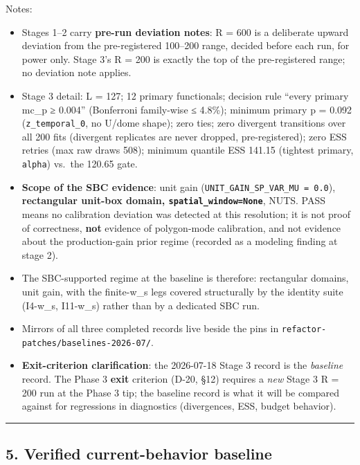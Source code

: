 \documentclass[
  10pt,
]{article}
\providecommand{\tightlist}{%
  \setlength{\itemsep}{0pt}\setlength{\parskip}{0pt}}
\begin{document}
Notes:

\begin{itemize}
\tightlist
\item
  Stages 1--2 carry \textbf{pre-run deviation notes}: R = 600 is a deliberate upward deviation from the pre-registered 100--200 range, decided before each run, for power only. Stage 3's R = 200 is exactly the top of the pre-registered range; no deviation note applies.
\item
  Stage 3 detail: L = 127; 12 primary functionals; decision rule ``every primary mc\_p ≥ 0.004'' (Bonferroni family-wise ≤ 4.8\%); minimum primary p = 0.092 (\texttt{z\_temporal\_0}, no U/dome shape); zero ties; zero divergent transitions over all 200 fits (divergent replicates are never dropped, pre-registered); zero ESS retries (max raw draws 508); minimum quantile ESS 141.15 (tightest primary, \texttt{alpha}) vs.~the 120.65 gate.
\item
  \textbf{Scope of the SBC evidence}: unit gain (\texttt{UNIT\_\allowbreak{}GAIN\_\allowbreak{}SP\_\allowbreak{}VAR\_\allowbreak{}MU\ =\ 0.0}), \textbf{rectangular unit-box domain, \texttt{spatial\_window=None}}, NUTS. PASS means no calibration deviation was detected at this resolution; it is not proof of correctness, \textbf{not} evidence of polygon-mode calibration, and not evidence about the production-gain prior regime (recorded as a modeling finding at stage 2).
\item
  The SBC-supported regime at the baseline is therefore: rectangular domains, unit gain, with the finite-w\_s legs covered structurally by the identity suite (I4-w\_s, I11-w\_s) rather than by a dedicated SBC run.
\item
  Mirrors of all three completed records live beside the pins in \texttt{refactor-patches/\allowbreak{}baselines-2026-07/\allowbreak{}}.
\item
  \textbf{Exit-criterion clarification}: the 2026-07-18 Stage 3 record is the \emph{baseline} record. The Phase 3 \textbf{exit} criterion (D-20, §12) requires a \emph{new} Stage 3 R = 200 run at the Phase 3 tip; the baseline record is what it will be compared against for regressions in diagnostics (divergences, ESS, budget behavior).
\end{itemize}

\begin{center}\rule{0.5\linewidth}{0.5pt}\end{center}

\hypertarget{verified-current-behavior-baseline}{%
\subsection{5. Verified current-behavior baseline}\label{verified-current-behavior-baseline}}
\end{document}
